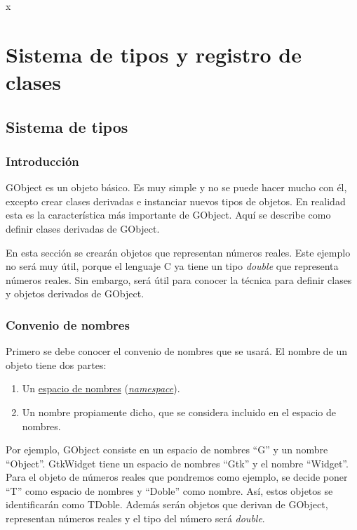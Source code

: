 x%
%

\section{Sistema de tipos y registro de clases}
\subsection{Sistema de tipos} \label{subsec:sistematipos}
\subsubsection{Introducción}
\textsf{GObject} es un objeto básico. Es muy simple y no se puede hacer mucho con él, excepto crear
clases derivadas e instanciar nuevos tipos de objetos.
En realidad esta es la característica más importante de \textsf{GObject}.
Aquí se describe como definir clases derivadas de \textsf{GObject}.

En esta sección se crearán objetos que representan números reales. Este ejemplo no será muy útil, porque
el lenguaje C ya tiene un tipo \emph{double} que representa números reales. Sin embargo, será útil para
conocer la técnica para definir clases y objetos derivados de \textsf{GObject}.

\subsubsection{Convenio de nombres}
Primero se debe conocer el convenio de nombres que se usará. El nombre de un objeto tiene dos partes:
\begin{enumerate}
  \tightlist
\item Un \href{https://es.wikipedia.org/wiki/Espacio_de_nombres}{espacio de nombres}
  (\href{https://en.wikipedia.org/wiki/Namespace}{\textit{namespace}}).
\item Un nombre propiamente dicho, que se considera incluido en el espacio de nombres.
\end{enumerate}

Por ejemplo, \textsf{GObject} consiste en un espacio de nombres ``\textsf{G}'' y un nombre ``\textsf{Object}''.
\textsf{GtkWidget} tiene un espacio de nombres ``\textsf{Gtk}'' y el nombre ``\textsf{Widget}''.
Para el objeto de números reales que pondremos como ejemplo, se decide poner ``\textsf{T}'' como espacio
de nombres y ``\textsf{Doble}'' como nombre. Así, estos objetos se identificarán como \textsf{TDoble}.
Además serán objetos que derivan de \textsf{GObject}, representan números reales y el tipo del número
será \textit{double}.


